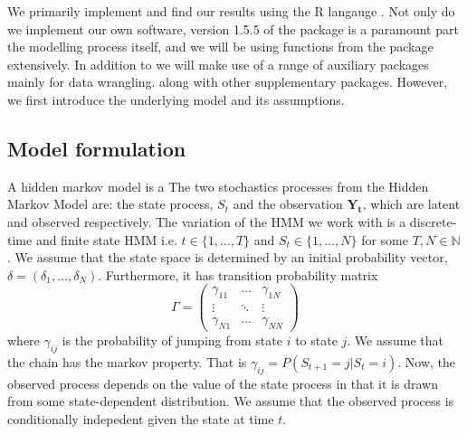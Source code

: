 We primarily implement and find our results using the R langauge \cite{RLang}.
Not only do we implement our own software, version 1.5.5 of the package  \cite{momentuHMM} is a paramount part the modelling process itself, and we will be using functions from the package extensively. In addition to  we will make use of a range of auxiliary packages mainly for data wrangling.\cite{tidyverse}\cite{Rcpp} along with other supplementary packages.\cite{gridExtra}\cite{microbenchmark}\cite{ggthemes}\cite{ggmap}\cite{mapview} However, we first introduce the underlying model and its assumptions.
\subsection*{Model formulation}
A hidden markov model is a 
The two stochastics processes from the Hidden Markov Model are: the state process, $S_t$ and the observation $\mathbf{Y_t}$, which are latent and observed respectively. The variation of the HMM we work with is a discrete-time and finite state HMM i.e. $t\in\{1,\dots , T\}$ and $S_t\in\{1,\dots , N\}$ for some $T, N\in\mathbb{N}$. We assume that the state space is determined by an initial probability vector, $\delta = \left(\delta_1,\dots, \delta_N \right)$. Furthermore, it has transition probability matrix
\[
    \Gamma = \begin{pmatrix}
        \gamma_{11} & \dots &  \gamma_{1N} \\
        \vdots & \ddots & \vdots \\
        \gamma_{N1} & \dots & \gamma_{NN}
    \end{pmatrix}
\]
where $\gamma_{ij}$ is the probability of jumping from state $i$ to state $j$. We assume that the chain has the markov property. That is $\gamma_{ij} = P\left(S_{t+1} = j | S_t = i\right)$. Now, the observed process depends on the value of the state process in that it is drawn from some state-dependent distribution. We assume that the observed process is conditionally indepedent given the state at time $t$. 
\cite{UncoveringEcologicalState}